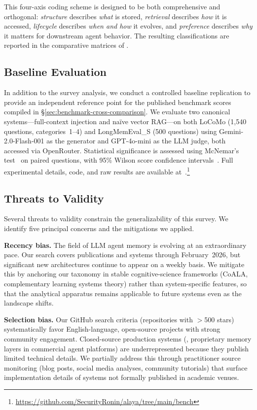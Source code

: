 This four-axis coding scheme is designed to be both comprehensive and
orthogonal: \emph{structure} describes \emph{what} is stored,
\emph{retrieval} describes \emph{how} it is accessed, \emph{lifecycle}
describes \emph{when and how} it evolves, and \emph{preference} describes
\emph{why} it matters for downstream agent behavior. The resulting
classifications are reported in the comparative matrices of
.

\subsection{Baseline Evaluation}
\label{sec:methodology-baseline}

In addition to the survey analysis, we conduct a controlled baseline
replication to provide an independent reference point for the published
benchmark scores compiled in \S\ref{sec:benchmark-cross-comparison}.  We
evaluate two canonical systems---full-context injection and na\"ive vector
RAG---on both LoCoMo (1{,}540 questions, categories~1--4) and LongMemEval\_S
(500 questions) using Gemini-2.0-Flash-001 as the generator and GPT-4o-mini as
the LLM judge, both accessed via OpenRouter.  Statistical significance is
assessed using McNemar's test~\cite{mcnemar1947} on paired questions, with
95\% Wilson score confidence intervals~\cite{wilson1927}.  Full experimental details, code, and raw results are
available at~\cite{alaya2026}.\footnote{\url{https://github.com/SecurityRonin/alaya/tree/main/bench}}

\subsection{Threats to Validity}
\label{sec:threats}

Several threats to validity constrain the generalizability of this survey.
We identify five principal concerns and the mitigations we applied.

\textbf{Recency bias.} The field of LLM agent memory is evolving at an
extraordinary pace. Our search covers publications and systems through
February~2026, but significant new architectures continue to appear on a
weekly basis. We mitigate this by anchoring our taxonomy in stable
cognitive-science frameworks (CoALA, complementary learning systems
theory) rather than system-specific features, so that the analytical
apparatus remains applicable to future systems even as the landscape
shifts.

\textbf{Selection bias.} Our GitHub search criteria (repositories with
$>$500 stars) systematically favor English-language, open-source projects
with strong community engagement. Closed-source production systems
(\eg, proprietary memory layers in commercial agent platforms) are
underrepresented because they publish limited technical details. We
partially address this through practitioner source monitoring (blog posts,
social media analyses, community tutorials) that surface implementation
details of systems not formally published in academic venues.


